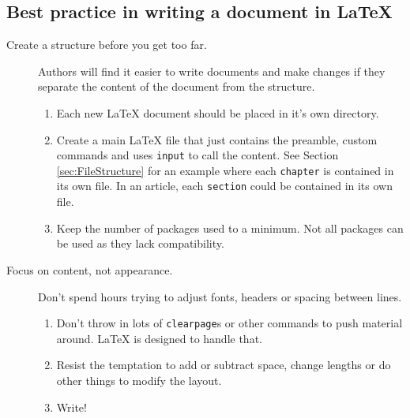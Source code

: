 \subsection{Best practice in writing a document in LaTeX}
\begin{description}
\item[Create a structure before you get too far.] Authors will find it easier to write documents and make changes if they separate the content of the document from the structure.
\begin{enumerate}
\item Each new LaTeX document should be placed in it's own directory. 
\item Create a main LaTeX file that just contains the preamble, custom commands and uses \texttt{input} to call the content. See Section \ref{sec:FileStructure} for an example where each \texttt{chapter} is contained in its own file. In an article, each \texttt{section} could be contained in its own file.
\item Keep the number of packages used to a minimum. Not all packages can be used as they lack compatibility.
\end{enumerate}
\item[Focus on content, not appearance.] Don't spend hours trying to adjust fonts, headers or spacing between lines. 
\begin{enumerate}
\item Don't throw in lots of \texttt{clearpage}s or other commands to push material around. LaTeX is designed to handle that. 
\item Resist the temptation to add or subtract space, change lengths or do other things to modify the layout. 
\item Write!
\end{enumerate}
\end{description}
